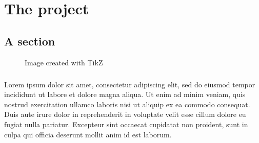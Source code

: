 
\chapter{The project}
\label{chp:project}

\section{A section}


\begin{figure}[ht]
    \centering
    
    \caption{Image created with TikZ} \label{fig:T1}
\end{figure}

\paragraph{}
Lorem ipsum dolor sit amet, consectetur adipiscing elit, sed do eiusmod tempor incididunt ut labore et dolore magna aliqua. Ut enim ad minim veniam, quis nostrud exercitation ullamco laboris nisi ut aliquip ex ea commodo consequat. Duis aute irure dolor in reprehenderit in voluptate velit esse cillum dolore eu fugiat nulla pariatur. Excepteur sint occaecat cupidatat non proident, sunt in culpa qui officia deserunt mollit anim id est laborum.


